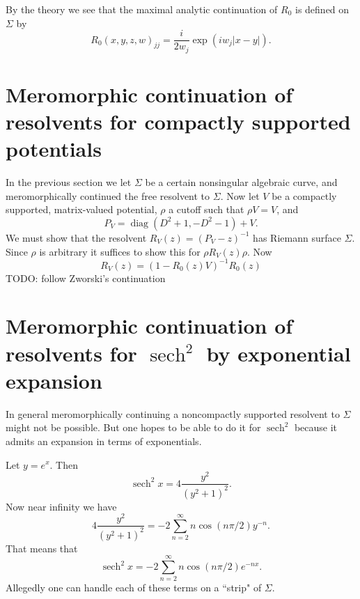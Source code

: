 \documentclass[12pt]{report}
\DeclareMathOperator{\sech}{sech}
\DeclareMathOperator{\diag}{diag}
\theoremstyle{definition}
\begin{document}
By the theory we see that the maximal analytic continuation of $R_0$ is defined on $\Sigma$ by
$$R_0(x, y, z, w)_{jj} = \frac{i}{2w_j}\exp(iw_j|x-y|).$$

\section{Meromorphic continuation of resolvents for compactly supported potentials}
In the previous section we let $\Sigma$ be a certain nonsingular algebraic curve, and meromorphically continued the free resolvent to $\Sigma$.
Now let $V$ be a compactly supported, matrix-valued potential, $\rho$ a cutoff such that $\rho V = V$, and
$$P_V = \diag(D^2 + 1, -D^2 - 1) + V.$$
We must show that the resolvent $R_V(z) = (P_V - z)^{-1}$ has Riemann surface $\Sigma$.
Since $\rho$ is arbitrary it suffices to show this for $\rho R_V(z) \rho$.
Now
$$R_V(z) = (1 - R_0(z)V)^{-1}R_0(z)$$
TODO: follow Zworski's continuation


\section{Meromorphic continuation of resolvents for $\sech^2$ by exponential expansion}
In general meromorphically continuing a noncompactly supported resolvent to $\Sigma$ might not be possible. But one hopes to be able to do it for $\sech^2$ because it admits an expansion in terms of exponentials.

Let $y = e^x$. Then
$$\sech^2 x = 4\frac{y^2}{(y^2 + 1)^2}.$$
Now near infinity we have
$$4\frac{y^2}{(y^2 + 1)^2} = -2\sum_{n=2}^\infty n\cos(n\pi/2)y^{-n}.$$
That means that
$$\sech^2 x = -2\sum_{n=2}^\infty n\cos(n\pi/2)e^{-nx}.$$
Allegedly one can handle each of these terms on a ``strip" of $\Sigma$.



\newpage
\printindex
\end{document}
